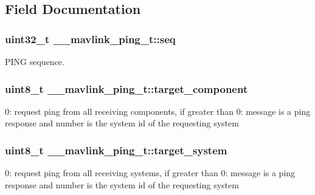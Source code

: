 \subsection{Field Documentation}
\hypertarget{struct____mavlink__ping__t_a753c4aa80232a414c05065646175bf46}{
\subsubsection[{seq}]{\setlength{\rightskip}{0pt plus 5cm}uint32\+\_\+t \+\_\+\+\_\+mavlink\+\_\+ping\+\_\+t\+::seq}}\label{struct____mavlink__ping__t_a753c4aa80232a414c05065646175bf46}


P\+I\+N\+G sequence. 

\hypertarget{struct____mavlink__ping__t_aea8c79743c35ac8e9d3d3362e2723f17}{
\subsubsection[{target\+\_\+component}]{\setlength{\rightskip}{0pt plus 5cm}uint8\+\_\+t \+\_\+\+\_\+mavlink\+\_\+ping\+\_\+t\+::target\+\_\+component}}\label{struct____mavlink__ping__t_aea8c79743c35ac8e9d3d3362e2723f17}


0\+: request ping from all receiving components, if greater than 0\+: message is a ping response and number is the system id of the requesting system 

\hypertarget{struct____mavlink__ping__t_a349dd7a0a95dc0a9faef1a498172efe3}{
\subsubsection[{target\+\_\+system}]{\setlength{\rightskip}{0pt plus 5cm}uint8\+\_\+t \+\_\+\+\_\+mavlink\+\_\+ping\+\_\+t\+::target\+\_\+system}}\label{struct____mavlink__ping__t_a349dd7a0a95dc0a9faef1a498172efe3}


0\+: request ping from all receiving systems, if greater than 0\+: message is a ping response and number is the system id of the requesting system 

